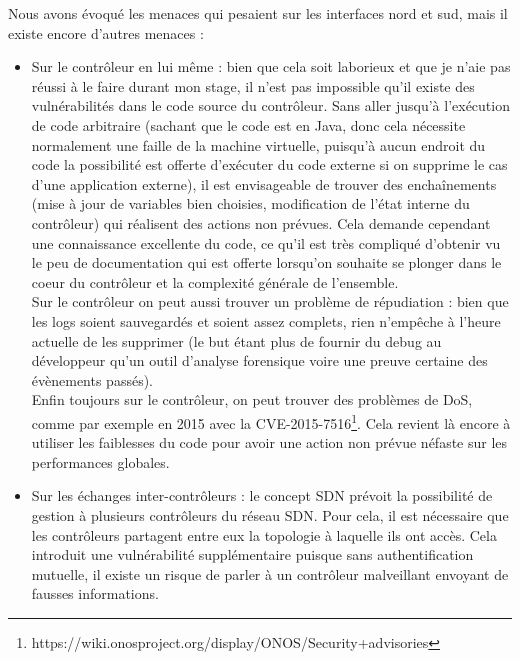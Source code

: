 Nous avons évoqué les menaces qui pesaient sur les interfaces nord et sud, mais il existe encore d'autres menaces :

\begin{itemize}

\item Sur le contrôleur en lui même : bien que cela soit laborieux et que je n'aie pas réussi à le faire durant mon stage, il n'est pas impossible qu'il existe des vulnérabilités dans le code source du contrôleur. Sans aller jusqu'à l'exécution de code arbitraire (sachant que le code est en Java, donc cela nécessite normalement une faille de la machine virtuelle, puisqu'à aucun endroit du code la possibilité est offerte d'exécuter du code externe si on supprime le cas d'une application externe), il est envisageable de trouver des enchaînements (mise à jour de variables bien choisies, modification de l'état interne du contrôleur) qui réalisent des actions non prévues. Cela demande cependant une connaissance excellente du code, ce qu'il est très compliqué d'obtenir vu le peu de documentation qui est offerte lorsqu'on souhaite se plonger dans le coeur du contrôleur et la complexité générale de l'ensemble.\\

Sur le contrôleur on peut aussi trouver un problème de répudiation : bien que les logs soient sauvegardés et soient assez complets, rien n'empêche à l'heure actuelle de les supprimer (le but étant plus de fournir du debug au développeur qu'un outil d'analyse forensique voire une preuve certaine des évènements passés).\\

Enfin toujours sur le contrôleur, on peut trouver des problèmes de DoS, comme par exemple en 2015 avec la CVE-2015-7516\footnote{https://wiki.onosproject.org/display/ONOS/Security+advisories}. Cela revient là encore à utiliser les faiblesses du code pour avoir une action non prévue néfaste sur les performances globales.\\

\item Sur les échanges inter-contrôleurs : le concept SDN prévoit la possibilité de gestion à plusieurs contrôleurs du réseau SDN. Pour cela, il est nécessaire que les contrôleurs partagent entre eux la topologie à laquelle ils ont accès. Cela introduit une vulnérabilité supplémentaire puisque sans authentification mutuelle, il existe un risque de parler à un contrôleur malveillant envoyant de fausses informations.\\


\end{itemize}

